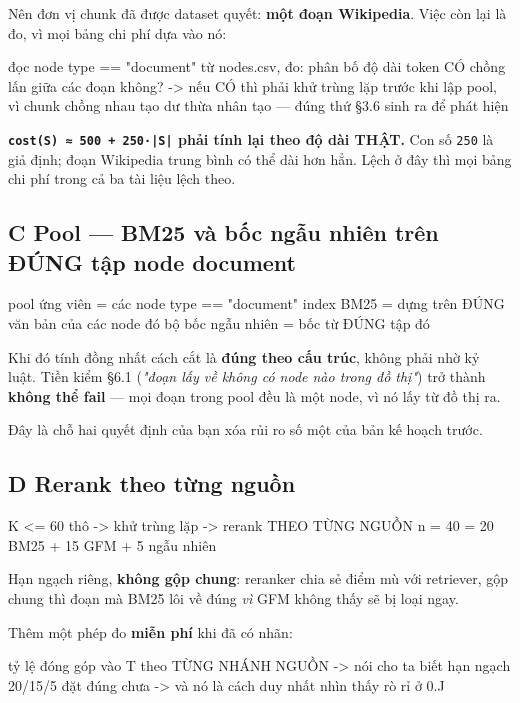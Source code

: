 \documentclass[11pt,a4paper]{article}
\begin{document}
Nên đơn vị chunk đã được dataset quyết: \textbf{một đoạn Wikipedia}. Việc còn lại là đo, vì mọi
bảng chi phí dựa vào nó:

\begin{dia}
đọc node type == "document" từ nodes.csv, đo:
    phân bố độ dài token
    CÓ chồng lấn giữa các đoạn không?
        -> nếu CÓ thì phải khử trùng lặp trước khi lập pool,
           vì chunk chồng nhau tạo dư thừa nhân tạo — đúng thứ §3.6 sinh ra để phát hiện
\end{dia}

\textbf{\texttt{cost(S) ≈ 500 + 250·|S|} phải tính lại theo độ dài THẬT.} Con số \texttt{250} là giả định; đoạn
Wikipedia trung bình có thể dài hơn hẳn. Lệch ở đây thì mọi bảng chi phí trong cả ba tài liệu
lệch theo.

\subsection{C Pool — BM25 và bốc ngẫu nhiên trên ĐÚNG tập node document}

\begin{dia}
pool ứng viên      = các node type == "document"
index BM25         = dựng trên ĐÚNG văn bản của các node đó
bộ bốc ngẫu nhiên  = bốc từ ĐÚNG tập đó
\end{dia}

Khi đó tính đồng nhất cách cắt là \textbf{đúng theo cấu trúc}, không phải nhờ kỷ luật. Tiền kiểm
\S{}6.1 (\emph{"đoạn lấy về không có node nào trong đồ thị"}) trở thành \textbf{không thể fail} — mọi đoạn
trong pool đều là một node, vì nó lấy từ đồ thị ra.

Đây là chỗ hai quyết định của bạn xóa rủi ro số một của bản kế hoạch trước.

\subsection{D Rerank theo từng nguồn}

\begin{dia}
K <= 60 thô  ->  khử trùng lặp  ->  rerank THEO TỪNG NGUỒN
n = 40  =  20 BM25  +  15 GFM  +  5 ngẫu nhiên
\end{dia}

Hạn ngạch riêng, \textbf{không gộp chung}: reranker chia sẻ điểm mù với retriever, gộp chung thì
đoạn mà BM25 lôi về đúng \emph{vì} GFM không thấy sẽ bị loại ngay.

Thêm một phép đo \textbf{miễn phí} khi đã có nhãn:

\begin{dia}
tỷ lệ đóng góp vào T theo TỪNG NHÁNH NGUỒN
->  nói cho ta biết hạn ngạch 20/15/5 đặt đúng chưa
->  và nó là cách duy nhất nhìn thấy rò rỉ ở 0.J
\end{dia}
\end{document}
